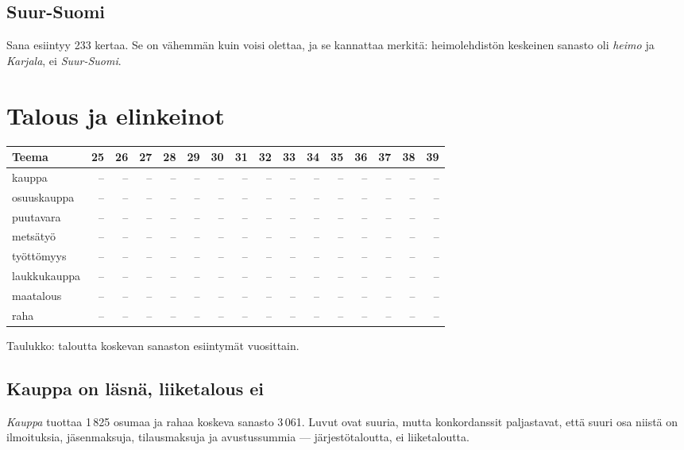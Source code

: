 \documentclass[10pt,a4paper]{article}
\begin{document}
\subsection{Suur-Suomi}

Sana esiintyy 233 kertaa. Se on vähemmän kuin voisi olettaa, ja se kannattaa merkitä:
heimolehdistön keskeinen sanasto oli \emph{heimo} ja \emph{Karjala}, ei
\emph{Suur-Suomi}.


\section{Talous ja elinkeinot}


\begin{center}\small
\begin{tabular}{@{}lrrrrrrrrrrrrrrr@{}}
\toprule
\textbf{Teema} & \textbf{25} & \textbf{26} & \textbf{27} & \textbf{28} & \textbf{29} & \textbf{30} & \textbf{31} & \textbf{32} & \textbf{33} & \textbf{34} & \textbf{35} & \textbf{36} & \textbf{37} & \textbf{38} & \textbf{39}\\
\midrule
kauppa & -- & -- & -- & -- & -- & -- & -- & -- & -- & -- & -- & -- & -- & -- & --\\
osuuskauppa & -- & -- & -- & -- & -- & -- & -- & -- & -- & -- & -- & -- & -- & -- & --\\
puutavara & -- & -- & -- & -- & -- & -- & -- & -- & -- & -- & -- & -- & -- & -- & --\\
metsätyö & -- & -- & -- & -- & -- & -- & -- & -- & -- & -- & -- & -- & -- & -- & --\\
työttömyys & -- & -- & -- & -- & -- & -- & -- & -- & -- & -- & -- & -- & -- & -- & --\\
laukkukauppa & -- & -- & -- & -- & -- & -- & -- & -- & -- & -- & -- & -- & -- & -- & --\\
maatalous & -- & -- & -- & -- & -- & -- & -- & -- & -- & -- & -- & -- & -- & -- & --\\
raha & -- & -- & -- & -- & -- & -- & -- & -- & -- & -- & -- & -- & -- & -- & --\\
\bottomrule
\end{tabular}
\end{center}
{\footnotesize Taulukko: taloutta koskevan sanaston esiintymät vuosittain.}

\subsection{Kauppa on läsnä, liiketalous ei}

\emph{Kauppa} tuottaa 1\,825 osumaa ja rahaa koskeva sanasto 3\,061. Luvut ovat suuria,
mutta konkordanssit paljastavat, että suuri osa niistä on ilmoituksia, jäsenmaksuja,
tilausmaksuja ja avustussummia --- järjestötaloutta, ei liiketaloutta.
\end{document}

